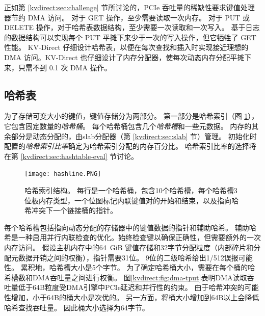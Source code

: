 正如第 \ref {kvdirect:sec:challenge} 节所讨论的，PCIe 吞吐量的稀缺性要求键值处理器节约 DMA 访问。
对于 GET 操作，至少需要读取一次内存。
对于 PUT 或 DELETE 操作，对于哈希表数据结构，至少需要一次读取和一次写入。
基于日志的数据结构可以实现每个 PUT 平摊下来少于一次的写入操作，但它牺牲了 GET 性能。
KV-Direct 仔细设计哈希表，以便在每次查找和插入时实现接近理想的 DMA 访问。KV-Direct 也仔细设计了内存分配器，使每次动态内存分配平摊下来，只需不到 0.1 次 DMA 操作。

\subsection{哈希表}
\label{kvdirect:sec:hashtable}

为了存储可变大小的键值，键值存储分为两部分。 第一部分是哈希索引（图 \ref {kvdirect:fig:hashtable}），它包含固定数量的\textit {哈希桶}。 每个哈希桶包含几个\textit {哈希槽}和一些元数据。 内存的其余部分是动态分配的，由slab分配器（第 \ref {kvdirect:sec:slab} 节）管理。
初始化时配置的\textit {哈希索引比率}确定为哈希索引分配的内存百分比。
哈希索引比率的选择将在第 \ref {kvdirect:sec:hashtable-eval} 节讨论。


\begin{figure}[htbp]
	\centering
	\texttt{[image: hashline.PNG]}
	\caption{哈希索引结构。 每行是一个哈希桶，包含10个哈希槽，每个哈希槽3位板内存类型，一个位图标记内联键值对的开始和结束，以及指向哈希冲突下一个链接桶的指针。}
	\label{kvdirect:fig:hashtable}
\end{figure}



每个哈希槽包括指向动态分配的存储器中的键值数据的指针和辅助哈希。
辅助哈希是一种启用并行内联检查的优化。始终检查键以确保正确性，但需要额外的一次内存访问。
假设主机内存中的64~GiB 键值存储和32字节分配粒度（内部碎片和分配元数据开销之间的权衡），指针需要31位。
9位的二级哈希给出1/512误报可能性。
累积地，哈希槽大小是5个字节。
为了确定哈希桶大小，需要在每个桶的哈希槽数和DMA吞吐量之间进行权衡。
图\ref {kvdirect:fig:dma-tput}表明DMA读取吞吐量低于64B粒度受DMA引擎中PCIe延迟和并行性的约束。
由于哈希冲突的可能性增加，小于64B的桶大小是次优的。
另一方面，将桶大小增加到64B以上会降低哈希查找吞吐量。
因此桶大小选择为64字节。

